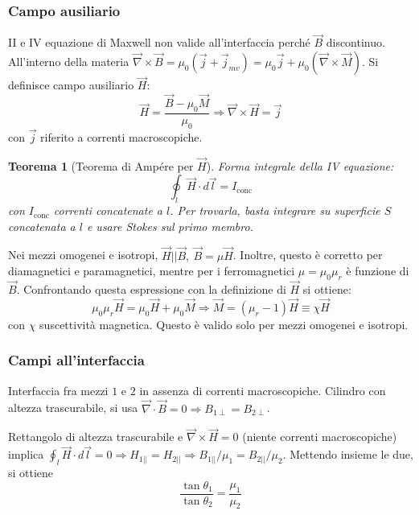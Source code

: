 \documentclass[a4paper]{scrartcl}
\numberwithin{equation}{subsection}
\theoremstyle{style1}
\newtheorem{teorema}{Teorema}[section]
\begin{document}
\subsubsection{Campo ausiliario}
II e IV equazione di Maxwell non valide all'interfaccia perch\'e $\vec{B}$ discontinuo. All'interno della materia $\vec{\nabla }\times \vec{B} = \mu_0 (\vec{j}+\vec{j}_{mv} )= \mu_0\vec{j} + \mu_0 (\vec{\nabla }\times \vec{M})$. Si definisce campo ausiliario $\vec{H}$:
\begin{equation}
		\vec{H} = \frac{\vec{B}- \mu_0\vec{M}}{\mu_0} \Rightarrow \vec{\nabla }\times \vec{H}= \vec{j}
\end{equation}
con $\vec{j}$ riferito a correnti macroscopiche.
\begin{teorema}
	[Teorema di Amp\'ere per $\vec{H}$]
	Forma integrale della IV equazione:
	\begin{equation}
		\oint_{l} \vec{H}\cdot d\vec{l}= I_\text{conc}
	\end{equation}
	con $I_\text{conc}$ correnti concatenate a $l$. Per trovarla, basta integrare su superficie $S$ concatenata a $l$ e usare Stokes sul primo membro.
\end{teorema}
Nei mezzi omogenei e isotropi, $\vec{H}| |\vec{B}, \ \vec{B} = \mu \vec{H}$. Inoltre, questo \`e corretto per diamagnetici e paramagnetici, mentre per i ferromagnetici $\mu = \mu_0 \mu _r$ \`e funzione di $\vec{B}$. Confrontando questa espressione con la definizione di $\vec{H}$ si ottiene:
\begin{equation}
	\mu_0 \mu_r \vec{H}=\mu_0 \vec{H}+ \mu_0\vec{M}\Rightarrow \vec{M}=(\mu_r -1) \vec{H}\equiv \chi \vec{H}
\end{equation}
con $\chi $ suscettivit\`a magnetica. Questo \`e valido solo per mezzi omogenei e isotropi.
\subsubsection{Campi all'interfaccia}

Interfaccia fra mezzi $1$ e $2$ in assenza di correnti macroscopiche. Cilindro con altezza trascurabile, si usa $\vec{\nabla }\cdot \vec{B} =0 \Rightarrow B_{1\perp} = B_{2\perp}  $.

Rettangolo di altezza trascurabile e $\vec{\nabla }\times \vec{H}=0$ (niente correnti macroscopiche) implica $\oint_{l} \vec{H}\cdot d\vec{l}= 0\Rightarrow H_{1||} = H_{2 | |}  \Rightarrow B_{1 | | }/ \mu_1 = B_{2  | |} / \mu_2  $. Mettendo insieme le due, si ottiene
\begin{equation}
	\frac{\tan \theta_1}{\tan \theta_2}= \frac{\mu_1}{\mu_2}
\end{equation}
\end{document}
